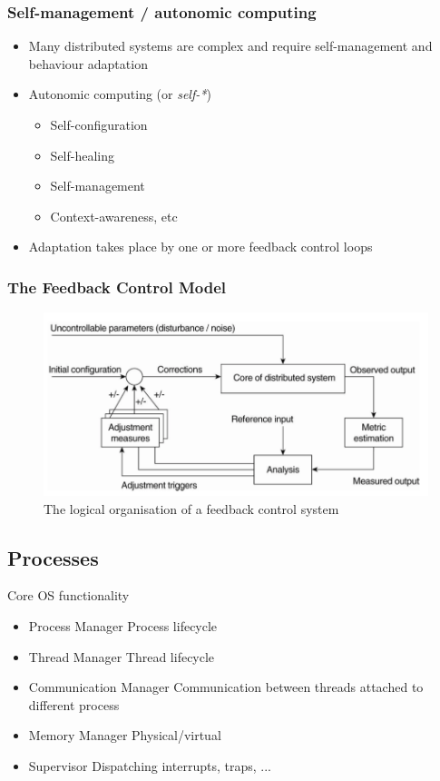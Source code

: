 \subsubsection{Self-management / autonomic computing}
\begin{itemize}
	\item Many distributed systems are complex and require self-management and behaviour adaptation
	\item Autonomic computing (or \textit{self-*})
	\begin{itemize}
		\item Self-configuration
		\item Self-healing
		\item Self-management
		\item Context-awareness, etc
	\end{itemize}
	\item Adaptation takes place by one or more feedback control loops	
\end{itemize}

\subsubsection{The Feedback Control Model}
\begin{figure}[H]
	\includegraphics[width=0.8\linewidth]{feedback}	
	\centering\caption{The logical organisation of a feedback control system}
\end{figure}



\subsection{Processes}
\begin{note}{Core OS functionality}
	\begin{itemize}
		\item Process Manager
		\subitem Process lifecycle
		\item Thread Manager
		\subitem Thread lifecycle
		\item Communication Manager
		\subitem Communication between threads attached to different process
		\item Memory Manager
		\subitem Physical/virtual
		\item Supervisor
		\subitem Dispatching interrupts, traps, ...	
	\end{itemize}
\end{note}
